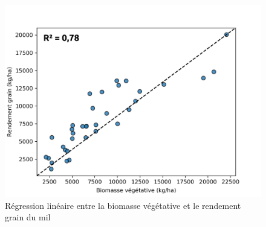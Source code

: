 \begin{figure}[htbp]
\caption*{Régression linéaire entre la biomasse végétative et le rendement grain du mil}
 \begin{center}
  \includegraphics[scale=0.6]{annexes/Biom_vs_Rdt_Mil.png}
 \end{center}
\end{figure}

